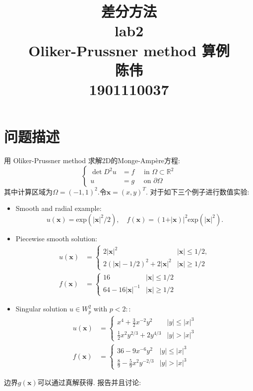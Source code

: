 \documentclass[11pt]{article}
\title{差分方法\uppercase\expandafter{\romannumeral2}\\
lab2\\
Oliker-Prussner method 算例\\
陈伟\\
1901110037}
\begin{document}
\maketitle %
\tableofcontents %

\newpage
\section{问题描述}
用 Oliker-Prussner method 求解2D的Monge-Ampère方程:
$$\left\{\begin{aligned}
\operatorname{det} D^{2} u &=f \quad \text { in } \Omega \subset \mathbb{R}^{2} \\
u &=g \quad \text { on } \partial \Omega
\end{aligned}\right.$$
其中计算区域为$\Omega=(-1,1)^2.$令$\bm{x}=(x,y)^T$. 对于如下三个例子进行数值实验:
\begin{itemize}
\item Smooth and radial example:
$$u(\bm{x})=\text{exp}(\vert{\bm{x}}\vert^2/2),\quad f(\bm{x})=(1+\vert{\bm{x}})\vert^2\text{exp}(\vert{\bm{x}}\vert^2).$$
\item Piecewise smooth solution:
$$\begin{array}{lll}
u(\boldsymbol{x}) & =\left\{\begin{array}{ll}
2|\boldsymbol{x}|^{2} & |\boldsymbol{x}| \leq 1 / 2, \\
2(|\boldsymbol{x}|-1 / 2)^{2}+2|\boldsymbol{x}|^{2} & |\boldsymbol{x}| \geq 1 / 2
\end{array}\right. \\
f(\boldsymbol{x}) & =\left\{\begin{array}{ll}
16 & |\boldsymbol{x}| \leq 1 / 2 \\
64-16|\boldsymbol{x}|^{-1} & |\boldsymbol{x}| \geq 1 / 2
\end{array}\right.
\end{array}$$
\item Singular solution $u\in W_p^2$ with $p < 2:$:
$$\begin{array}{lll}
u(\boldsymbol{x}) & =\left\{\begin{array}{ll}
x^{4}+\frac{3}{2} x^{-2} y^{2} & |y| \leq|x|^{3} \\
\frac{1}{2} x^{2} y^{2 / 3}+2 y^{4 / 3} & |y|>|x|^{3}
\end{array}\right. \\
f(\boldsymbol{x}) & =\left\{\begin{array}{ll}
36-9 x^{-6} y^{2} & |y| \leq|x|^{3} \\
\frac{8}{9}-\frac{5}{9} x^{2} y^{-2 / 3} & |y|>|x|^{3}
\end{array}\right.
\end{array}$$
\end{itemize}
边界$g(\bm{x})$可以通过真解获得. 报告并且讨论:
\end{document}
